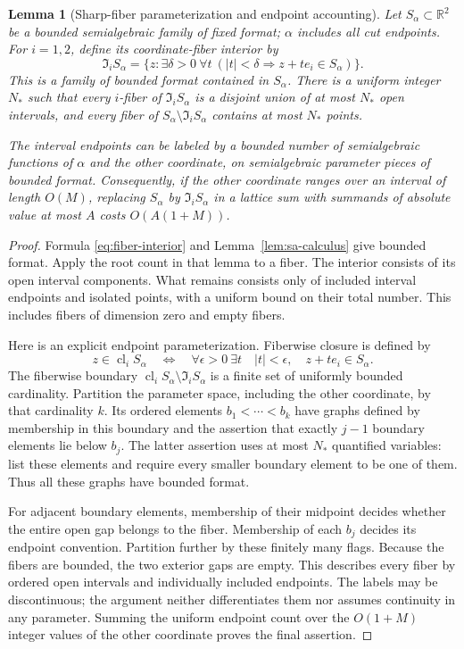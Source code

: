 \documentclass[11pt,a4paper]{article}
\numberwithin{equation}{section}
\newtheorem{lemma}[theorem]{Lemma}
\theoremstyle{remark}
\newcommand{\R}{\mathbb R}
\begin{document}
\begin{lemma}[Sharp-fiber parameterization and endpoint accounting]
\label{lem:sharp-fibers}
Let $S_\alpha\subset\R^2$ be a bounded semialgebraic family of fixed
format; $\alpha$ includes all cut endpoints. For $i=1,2$, define its
coordinate-fiber interior by
\begin{equation}\label{eq:fiber-interior}
 \mathfrak I_iS_\alpha
 =\{z:\exists\delta>0\ \forall t\ (|t|<\delta
                \Longrightarrow z+te_i\in S_\alpha)\}.
\end{equation}
This is a family of bounded format contained in $S_\alpha$.
There is a uniform integer $N_*$ such that every $i$-fiber of
$\mathfrak I_iS_\alpha$ is a disjoint union of at most $N_*$ open
intervals, and every fiber of $S_\alpha\setminus\mathfrak I_iS_\alpha$
contains at most $N_*$ points.

The interval endpoints can be labeled by a bounded number of
semialgebraic functions of $\alpha$ and the other coordinate, on
semialgebraic parameter pieces of bounded format. Consequently, if the
other coordinate ranges over an interval of length $O(M)$, replacing
$S_\alpha$ by $\mathfrak I_iS_\alpha$ in a lattice sum with summands of
absolute value at most $A$ costs $O(A(1+M))$.
\end{lemma}
\begin{proof}
Formula \eqref{eq:fiber-interior} and Lemma~\ref{lem:sa-calculus} give
bounded format. Apply the root count in that lemma to a fiber. The
interior consists of its open interval components. What remains consists
only of included interval endpoints and isolated points, with a uniform
bound on their total number. This includes fibers of dimension zero and
empty fibers.

Here is an explicit endpoint parameterization. Fiberwise closure is
defined by
\[
 z\in\operatorname{cl}_i S_\alpha
 \quad\Longleftrightarrow\quad
 \forall\epsilon>0\ \exists t\quad
 |t|<\epsilon,\quad z+te_i\in S_\alpha.
\]
The fiberwise boundary
$\operatorname{cl}_i S_\alpha\setminus\mathfrak I_iS_\alpha$
is a finite set of uniformly bounded cardinality. Partition the parameter
space, including the other coordinate, by that cardinality $k$. Its
ordered elements $b_1<\cdots<b_k$ have graphs defined by membership in
this boundary and the assertion that exactly $j-1$ boundary elements lie
below $b_j$. The latter assertion uses at most $N_*$ quantified variables:
list these elements and require every smaller boundary element to be one
of them. Thus all these graphs have bounded format.

For adjacent boundary elements, membership of their midpoint decides
whether the entire open gap belongs to the fiber. Membership of each
$b_j$ decides its endpoint convention. Partition further by these
finitely many flags. Because the fibers are bounded, the two exterior
gaps are empty. This describes every fiber by ordered open intervals and
individually included endpoints. The labels may be discontinuous; the
argument neither differentiates them nor assumes continuity in any
parameter. Summing the uniform endpoint count over the $O(1+M)$ integer
values of the other coordinate proves the final assertion.
\end{proof}
\end{document}
